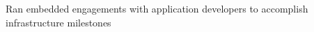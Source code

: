 \begin{job}

  \begin{extendedaccomplishments}
    \item Ran embedded engagements with application developers to accomplish infrastructure milestones
  \end{extendedaccomplishments}
\end{job}
